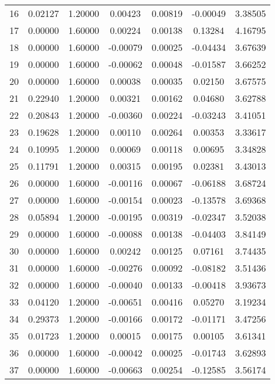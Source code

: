 \begin{longtable}{c c c c c c c}
16  &  0.02127 &      1.20000 &  0.00423 &   0.00819 &  -0.00049 &   3.38505 \\
17  &  0.00000 &      1.60000 &  0.00224 &   0.00138 &   0.13284 &   4.16795 \\
18  &  0.00000 &      1.60000 & -0.00079 &   0.00025 &  -0.04434 &   3.67639 \\
19  &  0.00000 &      1.60000 & -0.00062 &   0.00048 &  -0.01587 &   3.66252 \\
20  &  0.00000 &      1.60000 &  0.00038 &   0.00035 &   0.02150 &   3.67575 \\
21  &  0.22940 &      1.20000 &  0.00321 &   0.00162 &   0.04680 &   3.62788 \\
22  &  0.20843 &      1.20000 & -0.00360 &   0.00224 &  -0.03243 &   3.41051 \\
23  &  0.19628 &      1.20000 &  0.00110 &   0.00264 &   0.00353 &   3.33617 \\
24  &  0.10995 &      1.20000 &  0.00069 &   0.00118 &   0.00695 &   3.34828 \\
25  &  0.11791 &      1.20000 &  0.00315 &   0.00195 &   0.02381 &   3.43013 \\
26  &  0.00000 &      1.60000 & -0.00116 &   0.00067 &  -0.06188 &   3.68724 \\
27  &  0.00000 &      1.60000 & -0.00154 &   0.00023 &  -0.13578 &   3.69368 \\
28  &  0.05894 &      1.20000 & -0.00195 &   0.00319 &  -0.02347 &   3.52038 \\
29  &  0.00000 &      1.60000 & -0.00088 &   0.00138 &  -0.04403 &   3.84149 \\
30  &  0.00000 &      1.60000 &  0.00242 &   0.00125 &   0.07161 &   3.74435 \\
31  &  0.00000 &      1.60000 & -0.00276 &   0.00092 &  -0.08182 &   3.51436 \\
32  &  0.00000 &      1.60000 & -0.00040 &   0.00133 &  -0.00418 &   3.93673 \\
33  &  0.04120 &      1.20000 & -0.00651 &   0.00416 &   0.05270 &   3.19234 \\
34  &  0.29373 &      1.20000 & -0.00166 &   0.00172 &  -0.01171 &   3.47256 \\
35  &  0.01723 &      1.20000 &  0.00015 &   0.00175 &   0.00105 &   3.61341 \\
36  &  0.00000 &      1.60000 & -0.00042 &   0.00025 &  -0.01743 &   3.62893 \\
37  &  0.00000 &      1.60000 & -0.00663 &   0.00254 &  -0.12585 &   3.56174 \\

\end{longtable}
